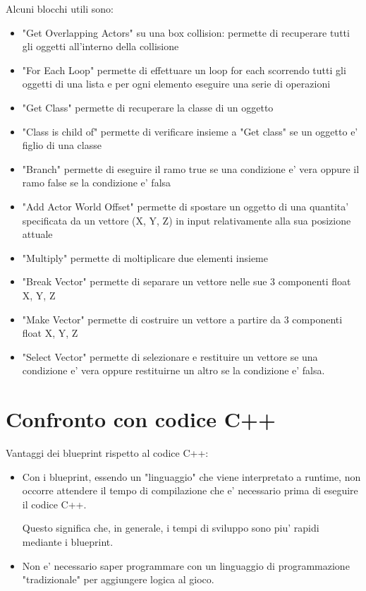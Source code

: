         Alcuni blocchi utili sono:

        \begin{itemize}
            \item "Get Overlapping Actors" su una box collision: permette di recuperare tutti gli oggetti all'interno della collisione
            \item "For Each Loop" permette di effettuare un loop for each scorrendo tutti gli oggetti di una lista e per ogni elemento eseguire una serie di operazioni
            \item "Get Class" permette di recuperare la classe di un oggetto
            \item "Class is child of" permette di verificare insieme a "Get class" se un oggetto e' figlio di una classe
            \item "Branch" permette di eseguire il ramo true se una condizione e' vera oppure il ramo false se la condizione e' falsa
            \item "Add Actor World Offset" permette di spostare un oggetto di una quantita' specificata da un vettore (X, Y, Z) in input relativamente alla sua posizione attuale
            \item "Multiply" permette di moltiplicare due elementi insieme
            \item "Break Vector" permette di separare un vettore nelle sue 3 componenti float X, Y, Z
            \item "Make Vector" permette di costruire un vettore a partire da 3 componenti float X, Y, Z
            \item "Select Vector" permette di selezionare e restituire un vettore se una condizione e' vera oppure restituirne un altro se la condizione e' falsa.
        \end{itemize}


    \section{Confronto con codice C++}
        Vantaggi dei blueprint rispetto al codice C++:
        \begin{itemize}
            \item Con i blueprint, essendo un "linguaggio" che viene interpretato a runtime, non occorre attendere il tempo di compilazione che e' necessario prima di eseguire il codice C++.

                Questo significa che, in generale, i tempi di sviluppo sono piu' rapidi mediante i blueprint.
            \item Non e' necessario saper programmare con un linguaggio di programmazione "tradizionale" per aggiungere logica al gioco.
        \end{itemize}

